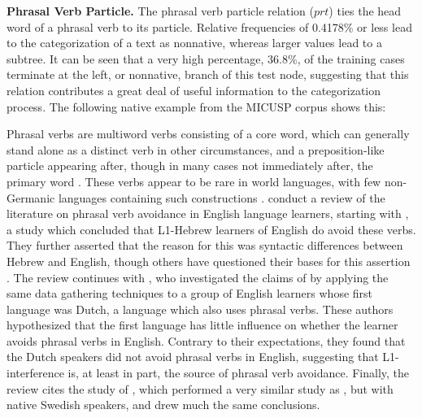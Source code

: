 \documentclass[main.tex]{subfiles}
\begin{document}

\textbf{Phrasal Verb Particle.} The phrasal verb particle relation ($prt$) ties the head word of a phrasal verb to its particle. Relative frequencies of 0.4178\% or less lead to the categorization of a text as nonnative, whereas larger values lead to a subtree. It can be seen that a very high percentage, 36.8\%, of the training cases terminate at the left, or nonnative, branch of this test node, suggesting that this relation contributes a great deal of useful information to the categorization process. The following native example from the MICUSP corpus shows this:

Phrasal verbs are multiword verbs consisting of a core word, which can generally stand alone as a distinct verb in other circumstances, and a preposition-like particle appearing after, though in many cases not immediately after, the primary word \citep{celce-murcia:1999}. These verbs appear to be rare in world languages, with few non-Germanic languages containing such constructions \citep{celce-murcia:1999}. \citet{liao:2004} conduct a review of the literature on phrasal verb avoidance in English language learners, starting with \citet{dagut:1985}, a study which concluded that L1-Hebrew learners of English do avoid these verbs. They further asserted that the reason for this was syntactic differences between Hebrew and English, though others have questioned their bases for this assertion \citep{liao:2004}. The review continues with \citet{hulstijn:1989}, who investigated the claims of \citeauthor{dagut:1985} by applying the same data gathering techniques to a group of English learners whose first language was Dutch, a language which also uses phrasal verbs. These authors hypothesized that the first language has little influence on whether the learner avoids phrasal verbs in English.  Contrary to their expectations, they found that the Dutch speakers did not avoid phrasal verbs in English, suggesting that L1-interference is, at least in part, the source of phrasal verb avoidance. Finally, the review cites the study of \citet{laufer:1993}, which performed a very similar study as \citeauthor{hulstijn:1989}, but with native Swedish speakers, and drew much the same conclusions.
\end{document}
